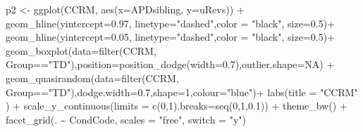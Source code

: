 \documentclass[a4paper, twoside]{templates/ociamthesis}
\newenvironment{Shaded}{\begin{snugshade}}{\end{snugshade}}
\newcommand{\AttributeTok}[1]{\textcolor[rgb]{0.77,0.63,0.00}{#1}}
\newcommand{\ConstantTok}[1]{\textcolor[rgb]{0.00,0.00,0.00}{#1}}
\newcommand{\DecValTok}[1]{\textcolor[rgb]{0.00,0.00,0.81}{#1}}
\newcommand{\FloatTok}[1]{\textcolor[rgb]{0.00,0.00,0.81}{#1}}
\newcommand{\FunctionTok}[1]{\textcolor[rgb]{0.00,0.00,0.00}{#1}}
\newcommand{\NormalTok}[1]{#1}
\newcommand{\OtherTok}[1]{\textcolor[rgb]{0.56,0.35,0.01}{#1}}
\newcommand{\SpecialCharTok}[1]{\textcolor[rgb]{0.00,0.00,0.00}{#1}}
\newcommand{\StringTok}[1]{\textcolor[rgb]{0.31,0.60,0.02}{#1}}
\renewenvironment{Shaded}
{
  \vspace{4pt}%
  \begin{snugshade}%
}{%
  \end{snugshade}%
  \vspace{4pt}%
}
\begin{document}
\begin{Shaded}
\begin{Highlighting}[]
  
\NormalTok{p2 }\OtherTok{\textless{}{-}} \FunctionTok{ggplot}\NormalTok{(CCRM, }\FunctionTok{aes}\NormalTok{(}\AttributeTok{x=}\NormalTok{APDsibling, }\AttributeTok{y=}\NormalTok{uRevs)) }\SpecialCharTok{+}
  \FunctionTok{geom\_hline}\NormalTok{(}\AttributeTok{yintercept=}\FloatTok{0.97}\NormalTok{, }\AttributeTok{linetype=}\StringTok{"dashed"}\NormalTok{,}\AttributeTok{color =} \StringTok{"black"}\NormalTok{, }\AttributeTok{size=}\FloatTok{0.5}\NormalTok{)}\SpecialCharTok{+}
  \FunctionTok{geom\_hline}\NormalTok{(}\AttributeTok{yintercept=}\FloatTok{0.05}\NormalTok{, }\AttributeTok{linetype=}\StringTok{"dashed"}\NormalTok{,}\AttributeTok{color =} \StringTok{"black"}\NormalTok{, }\AttributeTok{size=}\FloatTok{0.5}\NormalTok{)}\SpecialCharTok{+}
  \FunctionTok{geom\_boxplot}\NormalTok{(}\AttributeTok{data=}\FunctionTok{filter}\NormalTok{(CCRM, Group}\SpecialCharTok{==}\StringTok{"TD"}\NormalTok{),}\AttributeTok{position=}\FunctionTok{position\_dodge}\NormalTok{(}\AttributeTok{width=}\FloatTok{0.7}\NormalTok{),}\AttributeTok{outlier.shape=}\ConstantTok{NA}\NormalTok{) }\SpecialCharTok{+}
  \FunctionTok{geom\_quasirandom}\NormalTok{(}\AttributeTok{data=}\FunctionTok{filter}\NormalTok{(CCRM, Group}\SpecialCharTok{==}\StringTok{"TD"}\NormalTok{),}\AttributeTok{dodge.width=}\FloatTok{0.7}\NormalTok{,}\AttributeTok{shape=}\DecValTok{1}\NormalTok{,}\AttributeTok{colour=}\StringTok{"blue"}\NormalTok{)}\SpecialCharTok{+}
  \FunctionTok{labs}\NormalTok{(}\AttributeTok{title =} \StringTok{"CCRM"}\NormalTok{ ) }\SpecialCharTok{+} 
  \FunctionTok{scale\_y\_continuous}\NormalTok{(}\AttributeTok{limits =} \FunctionTok{c}\NormalTok{(}\DecValTok{0}\NormalTok{,}\DecValTok{1}\NormalTok{),}\AttributeTok{breaks=}\FunctionTok{seq}\NormalTok{(}\DecValTok{0}\NormalTok{,}\DecValTok{1}\NormalTok{,}\FloatTok{0.1}\NormalTok{)) }\SpecialCharTok{+}
  \FunctionTok{theme\_bw}\NormalTok{() }\SpecialCharTok{+}
  \FunctionTok{facet\_grid}\NormalTok{(. }\SpecialCharTok{\textasciitilde{}}\NormalTok{ CondCode, }\AttributeTok{scales =} \StringTok{"free"}\NormalTok{, }\AttributeTok{switch =} \StringTok{"y"}\NormalTok{)}


\end{Highlighting}
\end{Shaded}
\end{document}
